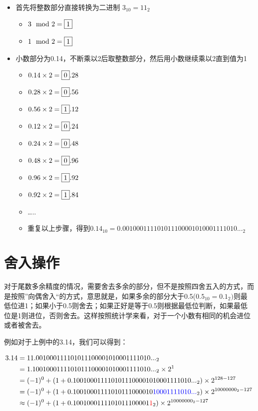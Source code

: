 \documentclass[12pt]{article}
\begin{document}
\begin{itemize}
\tightlist
\item
  首先将整数部分直接转换为二进制 \(3_{10} = 11_{2}\)

  \begin{itemize}
  \tightlist
  \item
    \(3\mod2 = \fbox{1}\)
  \item
    \(1\mod2 = \fbox{1}\)
  \end{itemize}
\item
  小数部分为0.14，不断乘以2后取整数部分，然后用小数继续乘以2直到值为1

  \begin{itemize}
  \tightlist
  \item
    \(0.14 \times 2 = \fbox{0}.28\)
  \item
    \(0.28 \times 2 = \fbox{0}.56\)
  \item
    \(0.56 \times 2 = \fbox{1}.12\)
  \item
    \(0.12 \times 2 = \fbox{0}.24\)
  \item
    \(0.24 \times 2 = \fbox{0}.48\)
  \item
    \(0.48 \times 2 = \fbox{0}.96\)
  \item
    \(0.96 \times 2 = \fbox{1}.92\)
  \item
    \(0.92 \times 2 = \fbox{1}.84\)
  \item
    \ldots..
  \item
    重复以上步骤，得到\(0.14_{10}=0.001000111101011100001010001111010..._{2}\)
  \end{itemize}
\end{itemize}

\section{舍入操作}\label{ux820dux5165ux64cdux4f5c}

对于尾数多余精度的情况，需要舍去多余的部分，但不是按照四舍五入的方式，而是按照''向偶舍入``的方式，意思就是，如果多余的部分大于0.5(\(0.5_{10} = 0.1_{2})\)则最低位进1；如果小于0.5则舍去；如果正好是等于0.5则根据最低位判断，如果最低位是1则进位，否则舍去。这样按照统计学来看，对于一个小数有相同的机会进位或者被舍去。

例如对于上例中的3.14，我们可以得到：

\[
\begin{aligned} 
3.14 &= 11.001000111101011100001010001111010..._{2} \\
    &= 1.1001000111101011100001010001111010..._{2} \times 2^{1} \\
    &= (-1)^{0} + (1 + 0.1001000111101011100001010001111010..._{2}) \times 2^{128 - 127} \\
    &= (-1)^{0} + (1 + 0.10010001111010111000010{\color{blue}{10001111010...}}_{2}) \times 2^{10000000_{2} - 127} \\
    &\approx (-1)^{0} + (1 + 0.1001000111101011100001{\color{red}1}_{2}) \times 2^{10000000_{2} - 127}
\end{aligned}
\]
\end{document}
